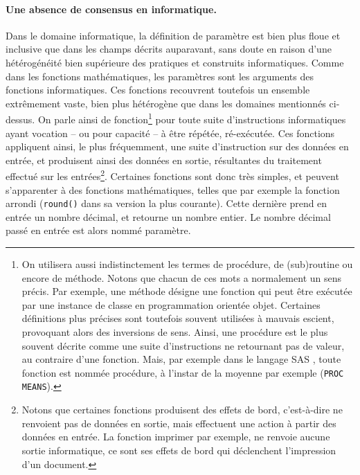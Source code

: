 \paragraph{Une absence de consensus en informatique.}
Dans le domaine informatique, la définition de \og paramètre\fg{} est bien plus floue et inclusive que dans les champs décrits auparavant, sans doute en raison d'une hétérogénéité bien supérieure des pratiques et construits informatiques.
Comme dans les fonctions mathématiques, les paramètres sont les arguments des fonctions informatiques.
Ces fonctions recouvrent toutefois un ensemble extrêmement vaste, bien plus hétérogène que dans les domaines mentionnés ci-dessus.
On parle ainsi de fonction\footnote{
	On utilisera aussi indistinctement les termes de procédure, de (sub)routine ou encore de méthode.
	Notons que chacun de ces mots a normalement un sens précis.
	Par exemple, une méthode désigne une fonction qui peut être exécutée par une instance de classe en programmation orientée objet.
	Certaines définitions plus précises sont toutefois souvent utilisées à mauvais escient, provoquant alors des inversions de sens.
	Ainsi, une procédure est le plus souvent décrite comme une suite d'instructions ne retournant pas de valeur, au contraire d'une fonction.
	Mais, par exemple dans le langage SAS \autocite{sas1990sas}, toute fonction est nommée procédure, à l'instar de la moyenne par exemple (\texttt{PROC MEANS}).
} pour toute suite d'instructions informatiques ayant vocation -- ou pour capacité -- à être répétée, ré-exécutée.
Ces fonctions appliquent ainsi, le plus fréquemment, une suite d'instruction sur des données en entrée, et produisent ainsi des données en sortie, résultantes du traitement effectué sur les entrées\footnote{
	Notons que certaines fonctions produisent des \og effets de bord\fg{}, c'est-à-dire ne renvoient pas de données en sortie, mais effectuent une action à partir des données en entrée.
	La fonction imprimer par exemple, ne renvoie aucune sortie informatique, ce sont ses effets de bord qui déclenchent l'impression d'un document.
}.
Certaines fonctions sont donc très simples, et peuvent s'apparenter à des fonctions mathématiques, telles que par exemple la fonction arrondi (\texttt{round()} dans sa version la plus courante).
Cette dernière prend en entrée un nombre décimal, et retourne un nombre entier.
Le nombre décimal passé en entrée est alors nommé paramètre.


